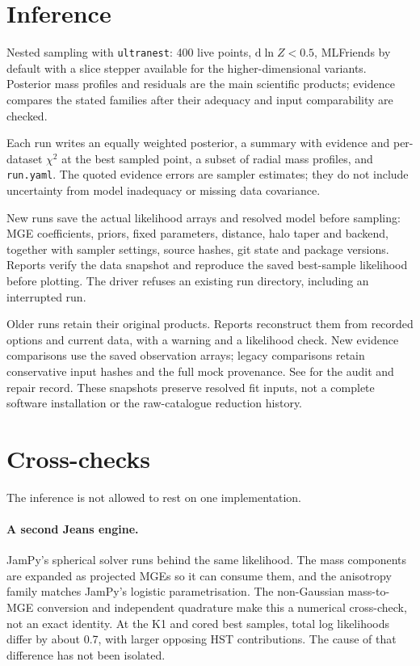 \documentclass[11pt,a4paper]{article}
\begin{document}
\section{Inference}

Nested sampling with \texttt{ultranest}: 400 live points, $\mathrm{d}\ln Z<0.5$, MLFriends by
default with a slice stepper available for the higher-dimensional variants. Posterior mass profiles and residuals are the main scientific products; evidence
compares the stated families after their adequacy and input comparability are checked.

Each run writes an equally weighted posterior, a summary with evidence and per-dataset
$\chi^2$ at the best sampled point, a subset of radial mass profiles, and \texttt{run.yaml}.
The quoted evidence errors are sampler estimates; they do not include uncertainty from
model inadequacy or missing data covariance.

New runs save the actual likelihood arrays and resolved model before sampling: MGE
coefficients, priors, fixed parameters, distance, halo taper and backend, together with
sampler settings, source hashes, git state and package versions. Reports verify the data
snapshot and reproduce the saved best-sample likelihood before plotting. The driver
refuses an existing run directory, including an interrupted run.

Older runs retain their original products. Reports reconstruct them from recorded options
and current data, with a warning and a likelihood check. New evidence comparisons use
the saved observation arrays; legacy comparisons retain conservative input hashes and
the full mock provenance. See  for the audit and repair
record. These snapshots preserve resolved fit inputs, not a complete software installation
or the raw-catalogue reduction history.

\section{Cross-checks}
\label{sec:crosschecks}

The inference is not allowed to rest on one implementation.

\paragraph{A second Jeans engine.} JamPy's spherical solver runs behind the same likelihood.
The mass components are expanded as projected MGEs so it can consume them, and the anisotropy
family matches JamPy's logistic parametrisation. The non-Gaussian mass-to-MGE conversion
and independent quadrature make this a numerical cross-check, not an exact identity.
At the K1 and cored best samples, total log likelihoods differ by about 0.7, with larger
opposing HST contributions. The cause of that difference has not been isolated.
\end{document}
